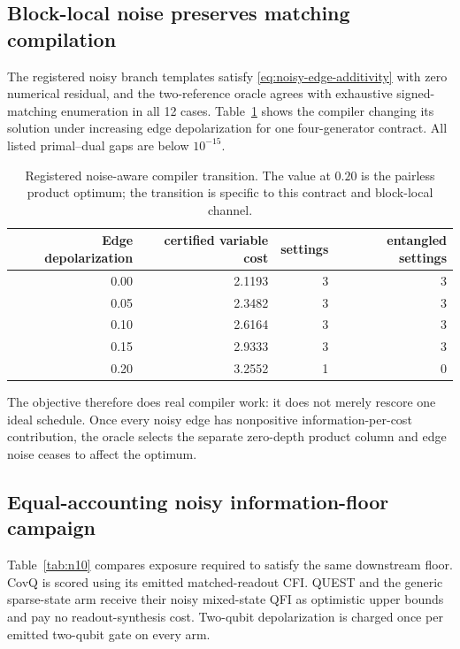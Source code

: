 \documentclass[11pt]{article}
\theoremstyle{definition}
\theoremstyle{remark}
\begin{document}
\subsection{Block-local noise preserves matching compilation}
\label{sec:results-noisy-compiler}
The registered noisy branch templates satisfy \cref{eq:noisy-edge-additivity} with zero numerical residual, and the two-reference oracle agrees with exhaustive signed-matching enumeration in all 12 cases. Table~\ref{tab:noisy-compiler} shows the compiler changing its solution under increasing edge depolarization for one four-generator contract. All listed primal--dual gaps are below $10^{-15}$.

\begin{table}[H]
\centering
\caption{Registered noise-aware compiler transition. The value at $0.20$ is the pairless product optimum; the transition is specific to this contract and block-local channel.}
\label{tab:noisy-compiler}
\begin{tabular}{rrrr}
\toprule
Edge depolarization & certified variable cost & settings & entangled settings\\
\midrule
0.00 & 2.1193 & 3 & 3\\
0.05 & 2.3482 & 3 & 3\\
0.10 & 2.6164 & 3 & 3\\
0.15 & 2.9333 & 3 & 3\\
0.20 & 3.2552 & 1 & 0\\
\bottomrule
\end{tabular}
\end{table}

The objective therefore does real compiler work: it does not merely rescore one ideal schedule. Once every noisy edge has nonpositive information-per-cost contribution, the oracle selects the separate zero-depth product column and edge noise ceases to affect the optimum.

\subsection{Equal-accounting noisy information-floor campaign}
\label{sec:results-n10}
Table~\ref{tab:n10} compares exposure required to satisfy the same downstream floor. CovQ is scored using its emitted matched-readout CFI. QUEST and the generic sparse-state arm receive their noisy mixed-state QFI as optimistic upper bounds and pay no readout-synthesis cost. Two-qubit depolarization is charged once per emitted two-qubit gate on every arm.
\end{document}
